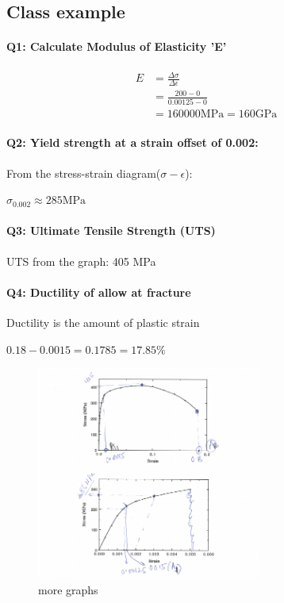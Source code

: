 \documentclass{article}
\begin{document}
\subsection{Class example}

\paragraph{Q1: Calculate Modulus of Elasticity 'E'}

\begin{equation*}
\begin{split}
    E &= \frac{\Delta\sigma}{\Delta\epsilon}\\
    &= \frac{200-0}{0.00125-0} \\
    &= 160 000 \si\MPa = 160 \si\GPa
\end{split}
\end{equation*}

\paragraph{Q2: Yield strength at a strain offset of 0.002:}

From the stress-strain diagram($\sigma-\epsilon$):

$\sigma_0.002 \approx 285 \si\MPa$

\paragraph{Q3: Ultimate Tensile Strength (UTS)}

UTS from the graph: 405 \si\MPa

\paragraph{Q4: Ductility of allow at fracture} Ductility is the amount of plastic strain

$0.18 - 0.0015 = 0.1785 = 17.85\%$

\begin{figure}[h!]
	\centering
	\includegraphics[width=0.66\textwidth]{assets/9840bbbf.png}
	\caption{more graphs}
\end{figure}
\end{document}
